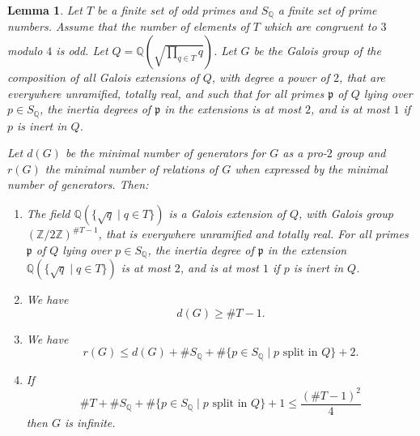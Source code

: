 \documentclass[12pt]{amsart}
\newtheorem{lemma}[theo]{Lemma}
\theoremstyle{remark}
\theoremstyle{definition}
\begin{document}
\begin{lemma}\label{group-infinite} Let $T$ be a finite set of odd primes and $S_{\mathbb Q}$ a finite set of prime numbers. Assume that the number of elements of $T$ which are congruent to $3$ modulo $4$ is odd. Let $Q = \mathbb Q( \sqrt{ \prod_{q\in T} q })$.  Let $G$ be the Galois group of the composition of all Galois extensions of $Q$, with degree a power of $2$, that are everywhere unramified, totally real, and such that for all primes $\mathfrak p$ of $Q$ lying over $p \in S_{\mathbb Q}$, the inertia degrees of $\mathfrak p$ in the extensions is at most $2$, and is at most $1$ if $p$ is inert in $Q$.

Let $d(G)$ be the minimal number of generators for $G$ as a pro-$2$ group and $r(G)$ the minimal number of relations of $G$ when expressed by the minimal number of generators. Then:

\begin{enumerate} 
\item The field  $\mathbb Q( \{\sqrt{q} \mid q \in T\})$ is a Galois extension of $Q$, with Galois group $(\mathbb Z/2\mathbb Z)^{ \#T-1}$, that is everywhere unramified and totally real. For all primes $\mathfrak p$ of $Q$ lying over $p \in S_{\mathbb Q}$, the inertia degree of $\mathfrak p$ in the extension $\mathbb Q( \{\sqrt{q} \mid q \in T\})$  is at most $2$, and is at most $1$ if $p$ is inert in $Q$.
\item We have \[ d(G) \geq \#T -1 .\]
\item We have \[ r(G) \leq d(G) +  \# S_\mathbb Q + \# \{p \in S_\mathbb Q \mid p \textrm{ split in }Q \}+2 .\]
\item If  \begin{equation}\label{infinitude-criterion} \#T  + \# S_\mathbb Q + \# \{p \in S_\mathbb Q \mid p \textrm{ split in }Q \} +1 \leq \frac{ (\#T -1)^2}{4} \end{equation} then $G$ is infinite.
\end{enumerate}
\end{lemma}
\end{document}
